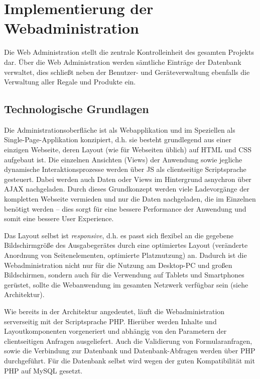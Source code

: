 \chapter{Implementierung der Webadministration}
\label{cha:impl_web}

Die Web Administration stellt die zentrale Kontrolleinheit des gesamten Projekts dar. Über die Web Administration werden sämtliche Einträge der Datenbank verwaltet, dies schließt neben der Benutzer- und Geräteverwaltung ebenfalls die Verwaltung aller Regale und Produkte ein.


\section{Technologische Grundlagen}

Die Administrationsoberfläche ist als Webapplikation und im Speziellen als Single-Page-Applikation konzipiert, d.h. sie besteht grundlegend aus einer einzigen Webseite, deren Layout (wie für Webseiten üblich) auf \ac{HTML} und \ac{CSS} aufgebaut ist. Die einzelnen Ansichten (Views) der Anwendung sowie jegliche dynamische Interaktionsprozesse werden über \acl{JS} als clientseitige Scriptsprache gesteuert. Dabei werden auch Daten oder Views im Hintergrund asnychron über \ac{AJAX} nachgeladen. Durch dieses Grundkonzept werden viele Ladevorgänge der kompletten Webseite vermieden und nur die Daten nachgeladen, die im Einzelnen benötigt werden -- dies sorgt für eine bessere Performance der Anwendung und somit eine bessere User Experience.

Das Layout selbst ist \emph{responsive}, d.h. es passt sich flexibel an die gegebene Bildschirmgröße des Ausgabegerätes durch eine optimiertes Layout (veränderte Anordnung von Seitenelementen, optimierte Platznutzung) an. Dadurch ist die Webadministration nicht nur für die Nutzung am Desktop-PC und großen Bildschirmen, sondern auch für die Verwendung auf Tablets und Smartphones gerüstet, sollte die Webanwendung im gesamten Netzwerk verfügbar sein (siehe Architektur).

Wie bereits in der Architektur angedeutet, läuft die Webadministration serverseitig mit der Scriptsprache \ac{PHP}. Hierüber werden Inhalte und Layoutkomponenten vorgeneriert und abhängig von den Parametern der clientseitigen Anfragen ausgeliefert. Auch die Validierung von Formularanfragen, sowie die Verbindung zur Datenbank und Datenbank-Abfragen werden über \ac{PHP} durchgeführt. Für die Datenbank selbst wird wegen der guten Kompatibilität mit PHP auf MySQL gesetzt.

